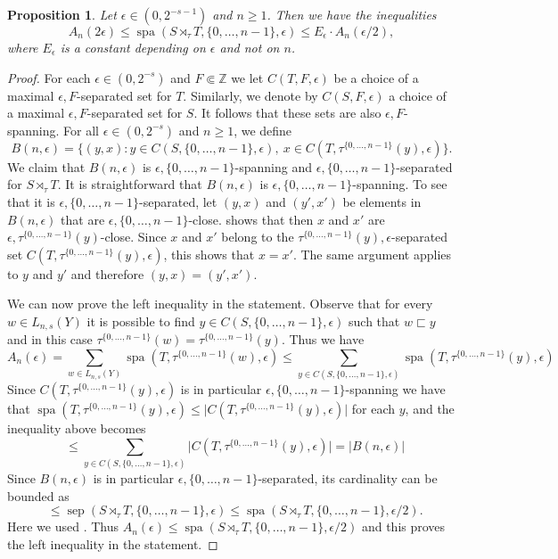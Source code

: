 \documentclass[a4paper,oneside]{amsart}
\renewcommand{\(}{\begin{dmath*}}
\renewcommand{\)}{\end{dmath*}}
\newtheorem{proposition}[theorem]{Proposition}
\theoremstyle{definition}
\newcommand{\Z}{\mathbb{Z}}
\newcommand{\sep}{\operatorname{sep}}
\newcommand{\spa}{\operatorname{spa}}
\begin{document}
\begin{proposition}\label{prop:the-set-A}
    Let $\epsilon\in (0,2^{-s-1})$ and $n\geq 1$. Then we have the inequalities
    \[A_n(2\epsilon)\leq \spa(S\rtimes_\tau T,\{0,\dots,n-1\},\epsilon)\leq E_{\epsilon}\cdot  A_n(\epsilon/2),\]
    where $E_{\epsilon}$ is a constant depending on $\epsilon$ and not on $n$.
\end{proposition}
\begin{proof}
For each $\epsilon\in(0,2^{-s})$ and $F\Subset \Z$ we let $C(T,F,\epsilon)$ be a choice of a maximal $\epsilon,F$-separated set for $T$. Similarly, we denote by $C(S,F,\epsilon)$ a choice of a maximal $\epsilon,F$-separated set for $S$. It follows that these sets are also $\epsilon,F$-spanning. For all $\epsilon\in(0,2^{-s})$ and $n\geq 1$, we define 
\[B(n,\epsilon)=\{(y,x) : y\in C(S,\{0,\dots,n-1\},\epsilon), \ x\in C(T,\tau^{\{0,\dots,n-1\}}(y),\epsilon)\}.\]
We claim that $B(n,\epsilon)$ is $\epsilon,\{0,\dots,n-1\}$-spanning and $\epsilon,\{0,\dots,n-1\}$-separated for $S\rtimes_\tau T$. It is straightforward that $B(n,\epsilon)$ is $\epsilon,\{0,\dots,n-1\}$-spanning. To see that it is $\epsilon,\{0,\dots,n-1\}$-separated, let $(y,x)$ and $(y',x')$ be elements in $B(n,\epsilon)$ that are $\epsilon,\{0,\dots,n-1\}$-close.   shows that then $x$ and $x'$ are $\epsilon, \tau^{\{0,\dots,n-1\}}(y)$-close. Since $x$ and $x'$ belong to the $\tau^{\{0,\dots,n-1\}}(y),\epsilon$-separated set $C(T,\tau^{\{0,\dots,n-1\}}(y),\epsilon)$, this shows that $x=x'$. The same argument applies to $y$ and $y'$ and therefore $(y,x)=(y',x')$.

We can now prove the left inequality in the statement. Observe that for every $w\in L_{n,s}(Y)$ it is possible to find $y\in C(S,\{0,\dots,n-1\},\epsilon)$ such that $w\sqsubset y$  and in this case $\tau^{\{0,\dots,n-1\}}(w)=\tau^{\{0,\dots,n-1\}}(y)$. Thus we have
\(
A_n(\epsilon)=\sum_{w\in L_{n,s}(Y)}\spa(T,\tau^{\{0,\dots,n-1\}}(w),\epsilon) \leq 
\sum_{y\in C(S,\{0,\dots,n-1\},\epsilon)} \spa(T,\tau^{\{0,\dots,n-1\}}(y),\epsilon)
\)
Since $C(T,\tau^{\{0,\dots,n-1\}}(y),\epsilon)$ is in particular $\epsilon,\{0,\dots,n-1\}$-spanning we have that $\spa(T,\tau^{\{0,\dots,n-1\}}(y),\epsilon)\leq \lvert C(T,\tau^{\{0,\dots,n-1\}}(y),\epsilon)\rvert$ for each $y$, and the inequality above becomes 
\(  
\phantom{a} \leq 
\sum_{y\in C(S,\{0,\dots,n-1\},\epsilon)} \lvert C(T,\tau^{\{0,\dots,n-1\}}(y),\epsilon)\rvert
= \lvert B(n,\epsilon)\rvert 
\)
Since  $B(n,\epsilon)$ is in particular $\epsilon,\{0,\dots,n-1\}$-separated, its cardinality can be bounded as
\(\phantom{a}\leq \sep 
 (S\rtimes_\tau T,\{0,\dots,n-1\},\epsilon) \leq\spa(S\rtimes_\tau T,\{0,\dots,n-1\},\epsilon/2).\)
Here we used . Thus $A_n(\epsilon)\leq \spa(S\rtimes_\tau T,\{0,\dots,n-1\},\epsilon/2)$ and this proves the left inequality in the statement.  



\end{proof}
\end{document}
